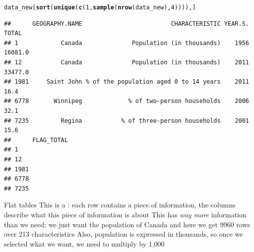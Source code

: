 \documentclass[aspectratio=169]{beamer}\usepackage[]{graphicx}\usepackage[]{xcolor}
\makeatletter
\newcommand{\hlnum}[1]{\textcolor[rgb]{0.686,0.059,0.569}{#1}}%
\newcommand{\hlsng}[1]{\textcolor[rgb]{0.192,0.494,0.8}{#1}}%
\newcommand{\hlopt}[1]{\textcolor[rgb]{0,0,0}{#1}}%
\newcommand{\hldef}[1]{\textcolor[rgb]{0.345,0.345,0.345}{#1}}%
\newcommand{\hlkwb}[1]{\textcolor[rgb]{0.69,0.353,0.396}{#1}}%
\newcommand{\hlkwd}[1]{\textcolor[rgb]{0.737,0.353,0.396}{\textbf{#1}}}%
\newenvironment{kframe}{%
 \def\at@end@of@kframe{}%
 \ifinner\ifhmode%
  \def\at@end@of@kframe{\end{minipage}}%
  \begin{minipage}{\columnwidth}%
 \fi\fi%
 \def\FrameCommand##1{\hskip\@totalleftmargin \hskip-\fboxsep
 \colorbox{shadecolor}{##1}\hskip-\fboxsep
     \hskip-\linewidth \hskip-\@totalleftmargin \hskip\columnwidth}%
 \MakeFramed {\advance\hsize-\width
   \@totalleftmargin\z@ \linewidth\hsize
   \@setminipage}}%
 {\par\unskip\endMakeFramed%
 \at@end@of@kframe}
\newenvironment{knitrout}{}{} %
\makeatother
\begin{document}
\begin{frame}[fragile]
\begin{knitrout}
\color{fgcolor}\begin{kframe}
\begin{alltt}
\hldef{data_new[}\hlkwd{sort}\hldef{(}\hlkwd{unique}\hldef{(}\hlkwd{c}\hldef{(}\hlnum{1}\hldef{,}\hlkwd{sample}\hldef{(}\hlkwd{nrow}\hldef{(data_new),} \hlnum{4}\hldef{)))), ]}
\end{alltt}
\begin{verbatim}
##      GEOGRAPHY.NAME                         CHARACTERISTIC YEAR.S.   TOTAL
## 1            Canada              Population (in thousands)    1956 16081.0
## 12           Canada              Population (in thousands)    2011 33477.0
## 1981     Saint John % of the population aged 0 to 14 years    2011    16.4
## 6778       Winnipeg             % of two-person households    2006    32.1
## 7235         Regina           % of three-person households    2001    15.6
##      FLAG_TOTAL
## 1              
## 12             
## 1981           
## 6778           
## 7235
\end{verbatim}
\end{kframe}
\end{knitrout}
\end{frame}


\begin{frame}{Flat tables}
This is a : each row contains a piece of information, the columns describe what this piece of information is about
\vfill
This has \emph{way more} information than we need: we just want the population of Canada and here we get 9960 rows over 213 characteristics
\vfill
Also, population is expressed in thousands, so once we selected what we want, we need to multiply by 1,000
\end{frame}

\end{document}
